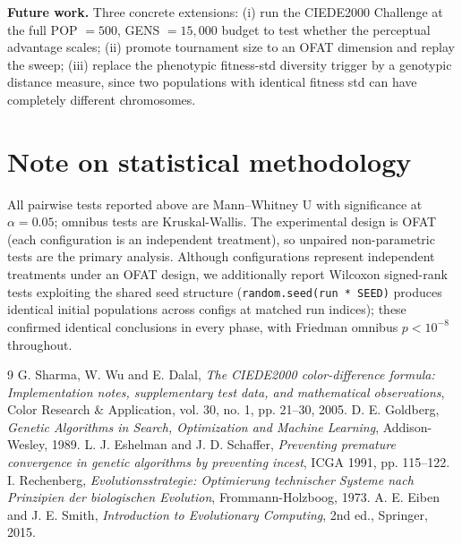 \documentclass[11pt,a4paper]{article}
\begin{document}
\textbf{Future work.} Three concrete extensions: (i) run the
CIEDE2000 Challenge at the full POP $= 500$, GENS $= 15{,}000$
budget to test whether the perceptual advantage scales; (ii) promote
tournament size to an OFAT dimension and replay the sweep; (iii)
replace the phenotypic fitness-std diversity trigger by a genotypic
distance measure, since two populations with identical fitness std
can have completely different chromosomes.

\section*{Note on statistical methodology}

All pairwise tests reported above are Mann--Whitney U with
significance at $\alpha = 0.05$; omnibus tests are Kruskal-Wallis. The
experimental design is OFAT (each configuration is an independent
treatment), so unpaired non-parametric tests are the primary analysis.
Although configurations represent independent treatments under an OFAT
design, we additionally report Wilcoxon signed-rank tests exploiting the
shared seed structure (\texttt{random.seed(run * SEED)} produces
identical initial populations across configs at matched run indices);
these confirmed identical conclusions in every phase, with Friedman
omnibus $p < 10^{-8}$ throughout.

\begin{thebibliography}{9}
 G. Sharma, W. Wu and E. Dalal,
\textit{The CIEDE2000 color-difference formula: Implementation notes,
supplementary test data, and mathematical observations},
Color Research \& Application, vol. 30, no. 1, pp. 21--30, 2005.
 D. E. Goldberg,
\textit{Genetic Algorithms in Search, Optimization and Machine Learning},
Addison-Wesley, 1989.
 L. J. Eshelman and J. D. Schaffer,
\textit{Preventing premature convergence in genetic algorithms by
preventing incest}, ICGA 1991, pp. 115--122.
 I. Rechenberg,
\textit{Evolutionsstrategie: Optimierung technischer Systeme nach
Prinzipien der biologischen Evolution}, Frommann-Holzboog, 1973.
 A. E. Eiben and J. E. Smith,
\textit{Introduction to Evolutionary Computing}, 2nd ed., Springer, 2015.
\end{thebibliography}


\appendix
\end{document}
